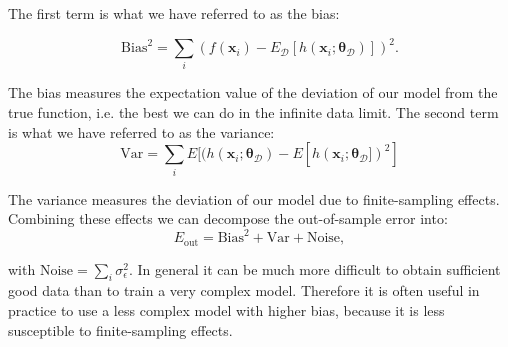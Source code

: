 The first term is what we have referred to as the bias:

\begin{equation}
    \text{Bias}^2 = \sum_i (f(\bm{x}_i) - E_{\mathcal{D}}[h(\bm{x}_i ; \bm{\theta}_{\mathcal{D}})])^2.
\end{equation}

The bias measures the expectation value of the deviation of our model from the true
function, i.e. the best we can do in the infinite data limit.
\newline
The second term is what we have referred to as the variance:
\begin{equation}
    \text{Var} = \sum_i  E[(h(\bm{x}_i ; \bm{\theta}_{\mathcal{D}}) - E[h(\bm{x}_i ; \bm{\theta}_{\mathcal{D}}])^2]
\end{equation}

The variance measures the deviation of our model due to finite-sampling effects.
Combining these effects we can decompose the out-of-sample error into:
\begin{equation}
    E_{\text{out}} = \text{Bias}^2 + \text{Var} + \text{Noise},
\end{equation}

with $\text{Noise} = \sum_i \sigma_{\epsilon}^2$.
\newline
In general it can be much more difficult to obtain sufficient good data
than to train a very complex model. Therefore it is often useful in practice
to use a less complex model with higher bias, because it is less susceptible
to finite-sampling effects.


